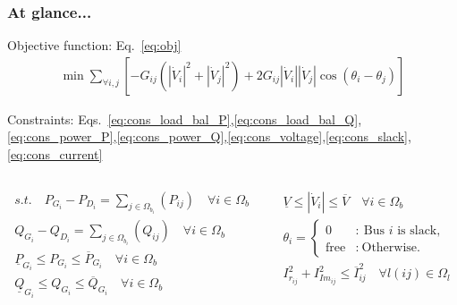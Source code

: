 \documentclass[
	11pt, %
	aspectratio=169, %
]{beamer}
\begin{document}
\begin{frame}
	\frametitle{At glance...}
	\label{frame:atglance}
	
	Objective function: Eq.~\eqref{eq:obj}
	\begin{align*}
		\min{ \sum_{\forall i,j} {[-G_{ij}(\left|\dot{V}_{i} \right|^2 + \left|\dot{V}_{j} \right|^2) + 2G_{ij}\left|\dot{V}_{i} \right|\left|\dot{V}_{j} \right|\cos\left(\theta_{i}-\theta_{j} \right) ]} }
	\end{align*}

	Constraints: Eqs.~\eqref{eq:cons_load_bal_P},\eqref{eq:cons_load_bal_Q},\eqref{eq:cons_power_P},\eqref{eq:cons_power_Q},\eqref{eq:cons_voltage},\eqref{eq:cons_slack},\eqref{eq:cons_current}
	\begin{columns}
		\begin{column}{0.5\textwidth}
			\begin{align*}
				s.t. \quad
				P_{G_{i}} - P_{D_{i}} = \sum_{j \in \Omega_{b_{i}}}(P_{ij})  \quad \forall i \in \Omega_{b}\\
				Q_{G_{i}} - Q_{D_{i}} = \sum_{j \in \Omega_{b_{i}}}(Q_{ij})  \quad \forall i \in \Omega_{b}\\
				\underline{P}_{G_{i}} \leq P_{G_{i}} \leq \overline{P}_{G_{i}}  \quad \forall i \in \Omega_{b}\\
				\underline{Q}_{G_{i}} \leq Q_{G_{i}} \leq \overline{Q}_{G_{i}}  \quad \forall i \in \Omega_{b}\\
			\end{align*}
		\end{column}

		\begin{column}{0.5\textwidth}
			\begin{align*}
				\underline{V} \leq \left|\dot{V}_{i} \right| \leq \overline{V}  \quad \forall i \in \Omega_{b}\\
				\theta_{i} = \left\{ \begin{array}{cl}
							0 & : \ \text{Bus } i \text{ is slack,} \\
							\text{free} & : \ \text{Otherwise.}
							\end{array} \right.\\
				I_{r_{ij}}^{2}+ I_{Im_{ij}}^{2} \leq \overline{I}_{ij}^{2} \quad   \forall l(ij) \in \Omega_{l}\\
			\end{align*}
		\end{column}
	\end{columns}
	
\end{frame}
\end{document}
